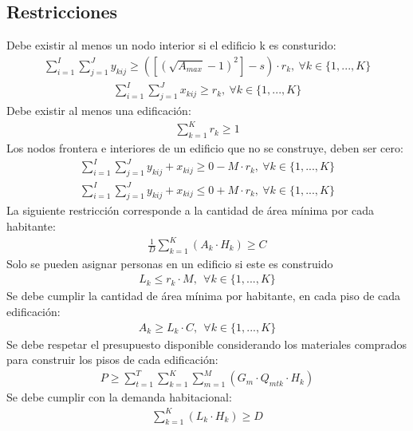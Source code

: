 \documentclass[letterpaper]{article}
\begin{document}
\subsection{Restricciones}
\noindent
Debe existir al menos un nodo interior si el edificio k es consturido:
\begin{gather}
	\displaystyle \sum_{i=1}^{I} \sum_{j=1}^{J} y_{kij} \geq ([(\sqrt{A_{max}}-1)^2] - s) \cdot r_{k}, \ \forall k \in \{1,...,K\}
\end{gather}
\begin{gather}
	\displaystyle \sum_{i=1}^{I} \sum_{j=1}^{J} x_{kij} \geq  r_{k}, \ \forall k \in \{1,...,K\}
\end{gather}
Debe existir al menos una edificación:
\begin{gather}
	\displaystyle \sum_{k=1}^{K} r_{k} \geq 1
\end{gather}
Los nodos frontera e interiores de un edificio que no se construye, deben ser cero:
\begin{gather}
	\displaystyle \sum_{i=1}^{I} \sum_{j=1}^{J} y_{kij} + x_{kij} \geq 0 - M \cdot r_{k}, \ \forall k \in \{1,...,K\} \\ 
	\displaystyle \sum_{i=1}^{I} \sum_{j=1}^{J} y_{kij} + x_{kij} \leq 0 + M \cdot r_{k}, \ \forall k \in \{1,...,K\}
\end{gather}
La siguiente restricción corresponde a la cantidad de área mínima por cada habitante:
\begin{gather}
	\frac{1}{D} \sum_{k=1}^{K} (A_{k} \cdot H_{k}) \geq C
\end{gather}
Solo se pueden asignar personas en un edificio si este es construido
\begin{gather}
	L_{k} \leq r_{k} \cdot M, \ \ \forall k \in \{1,...,K\}
\end{gather}
Se debe cumplir la cantidad de área mínima por habitante, en cada piso de cada edificación:
\begin{gather}
	A_{k} \geq L_{k} \cdot C, \ \ \forall k \in \{1,...,K\}
\end{gather}
Se debe respetar el presupuesto disponible considerando los materiales comprados para construir los pisos de cada edificación:
\begin{gather}
	P \geq \sum_{t=1}^{T}\sum_{k=1}^{K} \sum_{m=1}^{M} (G_{m} \cdot Q_{mtk} \cdot H_{k})
\end{gather}
Se debe cumplir con la demanda habitacional:
\begin{gather}
	\sum_{k=1}^{K} (L_{k} \cdot H_{k}) \geq D
\end{gather}
\end{document}
